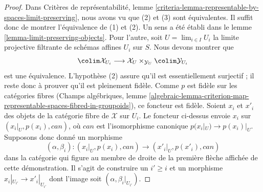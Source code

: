 \begin{proof}
Dans Critères de représentabilité, lemme
\ref{criteria-lemma-representable-by-spaces-limit-preserving}, nous avons vu
que (2) et (3) sont équivalentes. Il suffit donc de montrer l'équivalence de
(1) et (2). Un sens a été établi dans le lemme
\ref{lemma-limit-preserving-objects}. Pour l'autre, soit
$U = \lim_{i \in I} U_i$ la limite projective filtrante de schémas affines
$U_i$ sur $S$. Nous devons montrer que
$$
\colim \mathcal{X}_{U_i} \longrightarrow
\mathcal{X}_U \times_{\mathcal{Y}_U} \colim \mathcal{Y}_{U_i}
$$
est une équivalence. L'hypothèse (2) assure qu'il est essentiellement
surjectif ; il reste donc à prouver qu'il est pleinement fidèle. Comme $p$
est fidèle sur les catégories fibres (Champs algébriques, lemme
\ref{algebraic-lemma-criterion-map-representable-spaces-fibred-in-groupoids}),
ce foncteur est fidèle. Soient $x_i$ et $x'_i$ des objets de la catégorie
fibre de $\mathcal{X}$ sur $U_i$. Le foncteur ci-dessus envoie $x_i$ sur
$(x_i|_U, p(x_i), can)$, où $can$ est l'isomorphisme canonique
$p(x_i|_U) \to p(x_i)|_U$. Supposons donc donné un morphisme
$$
(\alpha, \beta_i) : (x_i|_U, p(x_i), can) \longrightarrow
(x'_i|_U, p(x'_i), can)
$$
dans la catégorie qui figure au membre de droite de la première flèche
affichée de cette démonstration. Il s'agit de construire un $i' \geq i$ et un
morphisme $x_i|_{U_{i'}} \to x'_i|_{U_{i'}}$ dont l'image soit
$(\alpha, \beta_i|_{U_{i'}})$.


\end{proof}

